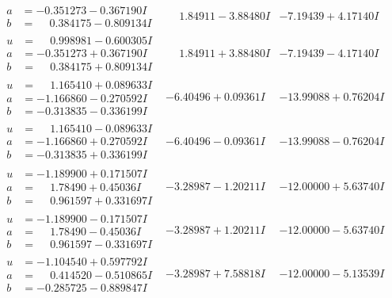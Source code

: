 \documentclass[1p]{elsarticle_modified}
\theoremstyle{definition}
\begin{document}
$$\begin{array}{c|c|c}
\begin{aligned}
a &= -0.351273 - 0.367190 I \\
b &= \phantom{-}0.384175 - 0.809134 I\end{aligned}
 & \phantom{-}1.84911 - 3.88480 I & -7.19439 + 4.17140 I \\ \hline\begin{aligned}
u &= \phantom{-}0.998981 - 0.600305 I \\
a &= -0.351273 + 0.367190 I \\
b &= \phantom{-}0.384175 + 0.809134 I\end{aligned}
 & \phantom{-}1.84911 + 3.88480 I & -7.19439 - 4.17140 I \\ \hline\begin{aligned}
u &= \phantom{-}1.165410 + 0.089633 I \\
a &= -1.166860 - 0.270592 I \\
b &= -0.313835 - 0.336199 I\end{aligned}
 & -6.40496 + 0.09361 I & -13.99088 + 0.76204 I \\ \hline\begin{aligned}
u &= \phantom{-}1.165410 - 0.089633 I \\
a &= -1.166860 + 0.270592 I \\
b &= -0.313835 + 0.336199 I\end{aligned}
 & -6.40496 - 0.09361 I & -13.99088 - 0.76204 I \\ \hline\begin{aligned}
u &= -1.189900 + 0.171507 I \\
a &= \phantom{-}1.78490 + 0.45036 I \\
b &= \phantom{-}0.961597 + 0.331697 I\end{aligned}
 & -3.28987 - 1.20211 I & -12.00000 + 5.63740 I \\ \hline\begin{aligned}
u &= -1.189900 - 0.171507 I \\
a &= \phantom{-}1.78490 - 0.45036 I \\
b &= \phantom{-}0.961597 - 0.331697 I\end{aligned}
 & -3.28987 + 1.20211 I & -12.00000 - 5.63740 I \\ \hline\begin{aligned}
u &= -1.104540 + 0.597792 I \\
a &= \phantom{-}0.414520 - 0.510865 I \\
b &= -0.285725 - 0.889847 I\end{aligned}
 & -3.28987 + 7.58818 I & -12.00000 - 5.13539 I \\ \hline\begin{aligned}

\end{aligned}
\end{array}$$
\end{document}
